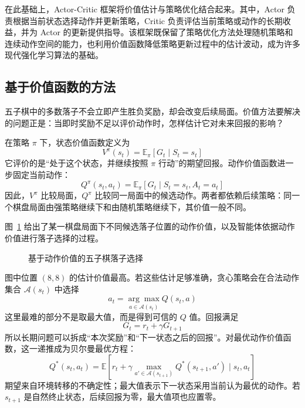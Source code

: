 在此基础上，Actor-Critic 框架将价值估计与策略优化结合起来。其中，Actor 负责根据当前状态选择动作并更新策略，Critic 负责评估当前策略或动作的长期收益，并为 Actor 的更新提供指导。该框架既保留了策略优化方法处理随机策略和连续动作空间的能力，也利用价值函数降低策略更新过程中的估计波动，成为许多现代强化学习算法的基础。

\subsection{基于价值函数的方法}

五子棋中的多数落子不会立即产生胜负奖励，却会改变后续局面。价值方法要解决的问题正是：当即时奖励不足以评价动作时，怎样估计它对未来回报的影响？

在策略 $\pi$ 下，状态价值函数定义为
\begin{equation}
V^{\pi}(s_t)
=
\mathbb{E}_{\pi}\!\left[G_t\mid S_t=s_t\right]
\end{equation}
它评价的是“处于这个状态，并继续按照 $\pi$ 行动”的期望回报。动作价值函数进一步固定当前动作：
\begin{equation}
Q^{\pi}(s_t,a_t)
=
\mathbb{E}_{\pi}\!\left[G_t\mid S_t=s_t,A_t=a_t\right]
\end{equation}
因此，$V^\pi$ 比较局面，$Q^\pi$ 比较同一局面中的候选动作。两者都依赖后续策略：同一个棋盘局面由强策略继续下和由随机策略继续下，其价值一般不同。

图~\ref{fig:gobang_value} 给出了某一棋盘局面下不同候选落子位置的动作价值，以及智能体依据动作价值进行落子选择的过程。

\begin{figure}[htbp]
  \centering
  \caption{基于动作价值的五子棋落子选择}
  \label{fig:gobang_value}
\end{figure}

图中位置 $(8,8)$ 的估计价值最高。若这些估计足够准确，贪心策略会在合法动作集合 $\mathcal A(s_t)$ 中选择
\begin{equation}
a_t
=
\underset{a\in\mathcal{A}(s_t)}{\arg\max}
Q(s_t,a)
\end{equation}
这里最难的部分不是取最大值，而是得到可信的 $Q$ 值。回报满足
\begin{equation}
G_t=r_t+\gamma G_{t+1}
\end{equation}
所以长期问题可以拆成“本次奖励”和“下一状态之后的回报”。对最优动作价值函数，这一递推成为贝尔曼最优方程：
\begin{equation}
Q^{*}(s_t,a_t)
=
\mathbb{E}\!\left[
r_t+\gamma\max_{a'\in\mathcal{A}(s_{t+1})}
Q^{*}(s_{t+1},a')
\mid s_t,a_t\right]
\end{equation}
期望来自环境转移的不确定性；最大值表示下一状态采用当前认为最优的动作。若 $s_{t+1}$ 是自然终止状态，后续回报为零，最大值项也应置零。

